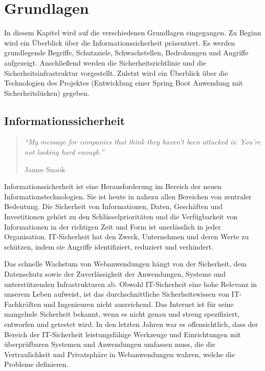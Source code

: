 \chapter{Grundlagen}
\label{cha:k2}

In diesem Kapitel wird auf die verschiedenen Grundlagen eingegangen. Zu Beginn wird ein Überblick über die Informationssicherheit präsentiert. Es werden grundlegende Begriffe, Schutzziele, Schwachstellen, Bedrohungen und Angriffe aufgezeigt. Anschließend werden die Sicherheitsrichtlinie und die Sicherheitsinfrastruktur vorgestellt. Zuletzt wird ein Überblick über die Technologien des Projektes (Entwicklung einer Spring Boot Anwendung mit Sicherheitslücken) gegeben.

\section{Informationssicherheit}

\begin{quote}
	\emph{"`My message for companies that think they haven't been attacked is: You're not looking hard enough."'}
	\begin{flushright}
		James Snook
	\end{flushright}
\end{quote}

Informationssicherheit ist eine Herausforderung im Bereich der neuen Informationstechnologien. Sie ist heute in nahezu allen Bereichen von zentraler Bedeutung. Die Sicherheit von Informationen, Daten, Geschäften und Investitionen gehört zu den Schlüsselprioritäten und die Verfügbarkeit von Informationen in der richtigen Zeit und Form ist unerlässlich in jeder Organisation. IT-Sicherheit hat den Zweck, Unternehmen und deren Werte zu schützen, indem sie Angriffe identifiziert, reduziert und verhindert.

Das schnelle Wachstum von Webanwendungen hängt von der Sicherheit, dem Datenschutz sowie der Zuverlässigkeit der Anwendungen, Systeme und unterstützenden Infrastrukturen ab. Obwohl IT-Sicherheit eine hohe Relevanz in unserem Leben aufweist, ist das durchschnittliche Sicherheitswissen von IT-Fachkräften und Ingenieuren nicht ausreichend. Das Internet ist für seine mangelnde Sicherheit bekannt, wenn es nicht genau und streng spezifiziert, entworfen und getestet wird. In den letzten Jahren war es offensichtlich, dass der Bereich der IT-Sicherheit leistungsfähige Werkzeuge und Einrichtungen mit überprüfbaren Systemen und Anwendungen umfassen muss, die die Vertraulichkeit und Privatsphäre in Webanwendungen wahren, welche die Probleme definieren\cite[1]{furnell2008securing}.

